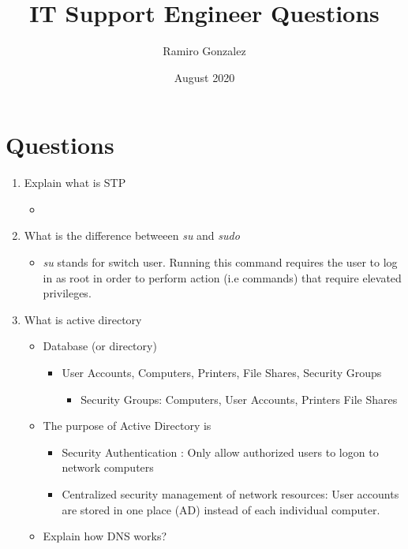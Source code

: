 \documentclass{article}
\title{IT Support Engineer Questions}
\author{Ramiro Gonzalez}
\date{August 2020}
\begin{document}
\maketitle
\section{Questions} 
\begin{enumerate}
    \item Explain what is STP
    \begin{itemize}
        \item 
    \end{itemize}
    \item What is the difference betweeen \textit{su} and \textit{sudo} 
    \begin{itemize}
        \item \textit{su} stands for switch user. Running this command requires the user to log in as root in order to perform action (i.e commands) that require elevated privileges. 
    \end{itemize}
    \item What is active directory 
    \begin{itemize}
        \item Database (or directory) 
        \begin{itemize}
            \item User Accounts, Computers, Printers, File Shares, Security Groups 
            \begin{itemize}
                \item Security Groups: Computers, User Accounts, Printers File Shares
            \end{itemize}
        \end{itemize}
        \item The purpose of  Active Directory is 
        \begin{itemize}
            \item Security Authentication : Only allow authorized users to logon to network computers
            \item Centralized security management of network resources: User accounts are stored in one place (AD) instead of each individual computer. 
        \end{itemize}
        \item Explain how DNS works?   
    \end{itemize}
\end{enumerate}
\end{document}

